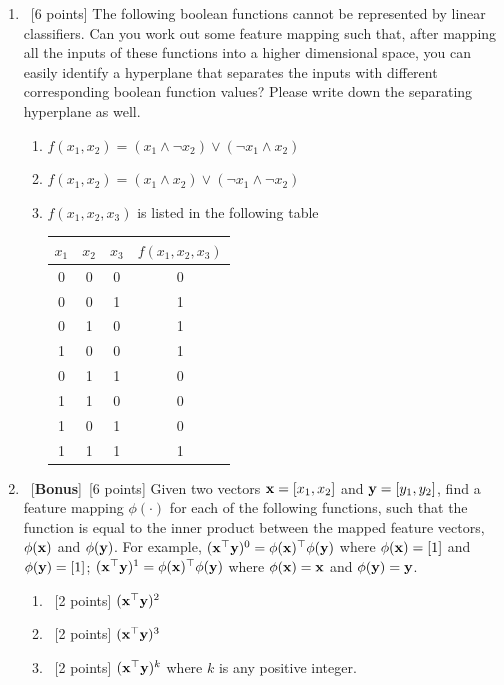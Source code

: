 \documentclass[12pt, fullpage,letterpaper]{article}
\begin{document}
\begin{enumerate}
	
	\item~[6 points] The following boolean functions cannot be represented by linear classifiers. Can you work out some feature mapping such that, after mapping all the inputs of these functions into a higher dimensional space, you can easily identify a hyperplane that separates the inputs with different corresponding boolean function values? Please write down the separating hyperplane as well. 
	\begin{enumerate}
		\item $f(x_1, x_2) = (x_1 \land \neg x_2) \lor (\neg x_1 \land x_2) $
		\item $f(x_1, x_2) = (x_1 \land x_2) \lor (\neg x_1 \land \neg x_2)$
		\item $f(x_1, x_2, x_3)$ is listed in the following table
		\begin{table}[h]
			\centering
			\begin{tabular}{ccc|c}
				$x_1$ & $x_2$ & $x_3$ &  $f(x_1, x_2, x_3)$\\ 
				\hline\hline
				0 & 0 & 0 & 0 \\ \hline
				0 & 0 & 1 & 1 \\ \hline
				0 & 1 & 0 & 1 \\ \hline
				1 & 0 & 0 & 1 \\ \hline
				0 & 1 & 1 & 0\\ \hline
				1 & 1 & 0 & 0\\ \hline
				1 & 0 & 1 & 0\\ \hline
				1 & 1 & 1 & 1\\ \hline
			\end{tabular}
		\end{table}
	\end{enumerate}
	
	\item~[\textbf{Bonus}]~[6 points]  Given two vectors ${\bf x} = [x_1,  x_2]$ and ${\bf y}=[y_1,  y_2]$, find a feature mapping $\phi(\cdot)$ for each of the following functions, such that the function is equal to the inner product between the mapped feature vectors, $\phi({\bf x})$ and $\phi({\bf y})$. For example, $({\bf x}^\top {\bf y})^0 = \phi({\bf x})^\top \phi({\bf y})$ where $\phi({\bf x}) = [1]$ and $\phi({\bf y}) = [1]$; $({\bf x}^\top {\bf y})^1 = \phi({\bf x})^\top \phi({\bf y})$ where $\phi({\bf x}) = {\bf x}$ and $\phi({\bf y}) = {\bf y}$. 
	\begin{enumerate}
		\item~[2 points] $({\bf x}^\top {\bf y})^2$
		\item~[2 points] $({\bf x}^\top {\bf y})^3$
		\item~[2 points] $({\bf x}^\top {\bf y})^k$ where $k$ is  any positive integer.  
	\end{enumerate}


\end{enumerate}
\end{document}
